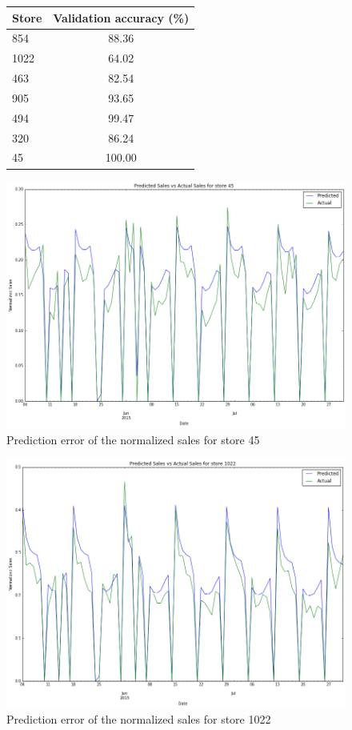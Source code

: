 \documentclass[DIV=calc, paper=a4, fontsize=11pt, twocolumn]{scrartcl}
\begin{document}
\begin{figure}[H]
    \centering
    \begin{tabular}{lc}
	    \toprule
	    Store 	& Validation accuracy (\%)\\
	    \toprule
	    854		& 88.36 	\\
	    1022	& 64.02 	\\
	    463		& 82.54		\\
	    905		& 93.65 	\\
	    494		& 99.47		\\
	    320 	& 86.24		\\
	    45		& 100.00	\\
	    \bottomrule
	    \end{tabular}
	\end{figure}

\begin{figure}[H]
    \centering
    \includegraphics[width=0.9\linewidth]{rossmann_prediction_errors_store45}
    \caption{Prediction error of the normalized sales for store 45}
    \label{fig_pred_45}
	\end{figure}

\begin{figure}[H]
    \centering
    \includegraphics[width=0.9\linewidth]{rossmann_prediction_errors_store1022}
    \caption{Prediction error of the normalized sales for store 1022}
    \label{fig:sub2}
	\end{figure}
\end{document}
